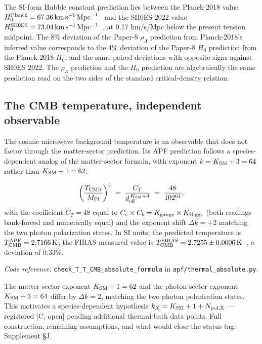 \documentclass[11pt]{article}
\newcommand{\coderef}[2]{\smallskip\noindent\textit{Code reference:} \texttt{#1} in \texttt{#2}.}
\newcommand{\Mpl}{M_{\rm Pl}}
\begin{document}
The SI-form Hubble constant prediction lies between the Planck-2018 value $H_0^{\rm Planck} = 67.36\,\mathrm{km}\,\mathrm{s}^{-1}\,\mathrm{Mpc}^{-1}$~\cite{Planck2018} and the SH0ES-2022 value $H_0^{\rm SH0ES} = 73.04\,\mathrm{km}\,\mathrm{s}^{-1}\,\mathrm{Mpc}^{-1}$~\cite{Riess2022}, at 0.17 km/s/Mpc below the present tension midpoint. The 8\% deviation of the Paper-8 $\rho_\Lambda$ prediction from Planck-2018's inferred value corresponds to the 4\% deviation of the Paper-8 $H_0$ prediction from the Planck-2018 $H_0$, and the same paired deviations with opposite signs against SH0ES 2022. The $\rho_\Lambda$ prediction and the $H_0$ prediction are algebraically the same prediction read on the two sides of the standard critical-density relation.

\subsection{The CMB temperature, independent observable}\label{sec:cosmology_T_CMB}

The cosmic microwave background temperature is an observable that does not factor through the matter-sector prediction. Its APF prediction follows a species-dependent analog of the matter-sector formula, with exponent $k = K_{\rm SM} + 3 = 64$ rather than $K_{\rm SM} + 1 = 62$:

\begin{tcolorbox}[apfbox, title={CMB thermal-bath formula}]
\[
\left(\frac{T_{\rm CMB}}{\Mpl}\right)^4 \;=\; \frac{C_T}{d_{\rm eff}^{\,K_{\rm SM}+3}} \;=\; \frac{48}{102^{64}},
\]
with the coefficient $C_T = 48$ equal to $C_c \times C_b = K_{\rm gauge} \times K_{\rm Higgs}$ (both readings bank-forced and numerically equal) and the exponent shift $\Delta k = +2$ matching the two photon polarization states. In SI units, the predicted temperature is $T_{\rm CMB}^{\rm APF} = 2.7166\,\mathrm{K}$; the FIRAS-measured value is $T_{\rm CMB}^{\rm FIRAS} = 2.7255 \pm 0.0006\,\mathrm{K}$~\cite{Fixsen2009}, a deviation of 0.33\%.
\end{tcolorbox}

\coderef{check\_T\_T\_CMB\_absolute\_formula}{apf/thermal\_absolute.py}

The matter-sector exponent $K_{\rm SM}+1 = 62$ and the photon-sector exponent $K_{\rm SM}+3 = 64$ differ by $\Delta k = 2$, matching the two photon polarisation states.  This motivates a species-dependent hypothesis $k_X = K_{\rm SM} + 1 + N_{\rm pol,X}$ --- registered [C, open] pending additional thermal-bath data points.  Full construction, remaining assumptions, and what would close the status tag: Supplement \S J.
\end{document}
